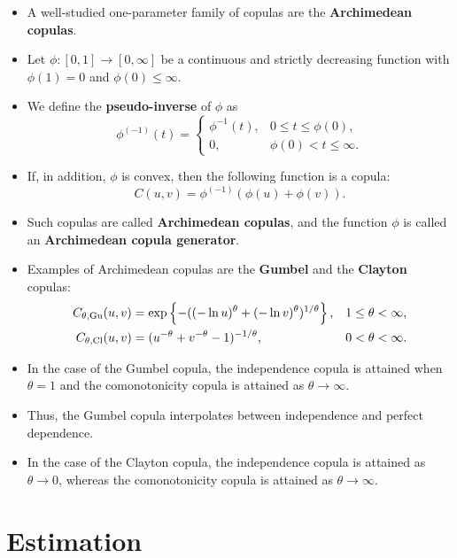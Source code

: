 \documentclass[square]{article} %
\theoremstyle{plain}
\theoremstyle{definition} %
\begin{document}
\begin{itemize}
\item A well-studied one-parameter family of copulas are the {\bf 
    Archimedean copulas}. 
\item Let $\phi:[0,1]\rightarrow[0,\infty]$ be a
  continuous and strictly decreasing function with $\phi(1)=0$ and
  $\phi(0)\leq\infty$.
\item  We define the {\bf pseudo-inverse} of $\phi$ as 
  \begin{equation*}
    \phi^{(-1)}(t)=
    \begin{cases}
      \phi^{-1}(t), &0\leq t\leq \phi(0),\\
      0, &\phi(0)<t\leq\infty.
    \end{cases}
  \end{equation*}
\item If, in addition, $\phi$ is convex, then the following function
  is a copula: 
  \begin{equation*}
    C(u,v)=\phi^{(-1)}(\phi(u)+\phi(v)).
  \end{equation*}
  \vspace*{-\baselineskip}
\item Such copulas are called {\bf Archimedean copulas}, and the
  function $\phi$ is called an {\bf Archimedean copula generator}. 
\item Examples of Archimedean copulas are the {\bf Gumbel} and the
  {\bf Clayton} copulas:
  \begin{align*}
    C_{\theta,{\rm Gu}}(u,v) &= \exp\left\{-((-\ln u)^\theta + (-\ln
                               v)^\theta)^{1/\theta}\right\},& 1\leq \theta<\infty,\\
    C_{\theta,{\rm Cl}}(u,v)&= (u^{-\theta} + v^{-\theta}
                              -1)^{-1/\theta}, & 0<\theta<\infty. 
  \end{align*}
\item In the case of the Gumbel copula, the independence copula is 
  attained when $\theta=1$ and the comonotonicity copula is attained
  as $\theta\rightarrow\infty$. 
\item Thus, the Gumbel copula interpolates between independence and
  perfect dependence.  
\item In the case of the Clayton copula, the independence copula is
  attained as $\theta\rightarrow 0$, whereas the comonotonicity
  copula is attained as $\theta\rightarrow\infty$. 
\end{itemize}


\section{Estimation}



\newpage
\end{document}
